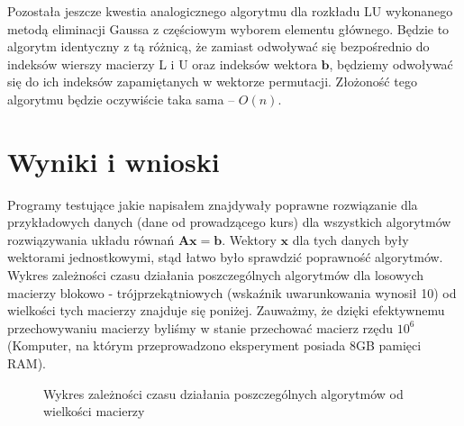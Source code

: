 \documentclass[]{article}
\newcommand{\mA}{\bm{A}}
\newcommand{\vb}{\bm{b}}
\newcommand{\vx}{\bm{x}}
\begin{document}
	Pozostała jeszcze kwestia analogicznego algorytmu dla rozkładu LU wykonanego metodą eliminacji Gaussa z częściowym wyborem elementu głównego. Będzie to algorytm identyczny z tą różnicą, że zamiast odwoływać się bezpośrednio do indeksów wierszy macierzy L i U oraz indeksów wektora $\vb$, będziemy odwoływać się do ich indeksów zapamiętanych w wektorze permutacji. Złożoność tego algorytmu będzie oczywiście taka sama -- $O(n)$.
	
	\section*{Wyniki i wnioski}
	
	Programy testujące jakie napisałem znajdywały poprawne rozwiązanie dla przykładowych danych (dane od prowadzącego kurs) dla wszystkich algorytmów rozwiązywania układu równań $\mA\vx=\vb$. Wektory $\vx$ dla tych danych były wektorami jednostkowymi, stąd łatwo było sprawdzić poprawność algorytmów.\\
	
	Wykres zależności czasu działania poszczególnych algorytmów dla losowych macierzy blokowo - trójprzekątniowych (wskaźnik uwarunkowania wynosił 10) od wielkości tych macierzy znajduje się poniżej. Zauważmy, że dzięki efektywnemu przechowywaniu macierzy byliśmy w stanie przechować macierz rzędu $10^6$ (Komputer, na którym przeprowadzono eksperyment posiada 8GB pamięci RAM).

\begin{figure}[h]
	\centering
	 \hfill
	\caption*{Wykres zależności czasu działania poszczególnych algorytmów od wielkości macierzy}
\end{figure}		
\end{document}
